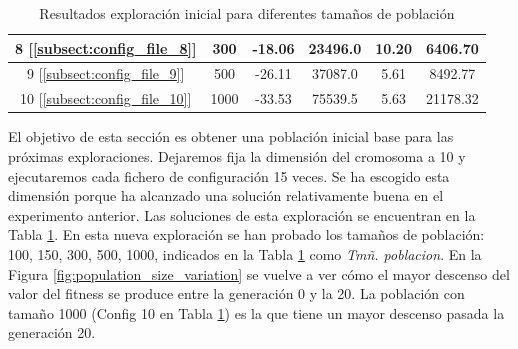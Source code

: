 \begin{table}[]
\begin{tabular}{|c|c|c|c|c|c|}
        8  [\ref{subsect:config_file_8}]                & 300                                                               & -18.06                                                                                & 23496.0                                                                            & 10.20                                                                         & 6406.70                                                                     \\ \hline
        9  [\ref{subsect:config_file_9}]                & 500                                                               & -26.11                                                                                & 37087.0                                                                            & 5.61                                                                          & 8492.77                                                                     \\ \hline
        10 [\ref{subsect:config_file_10}]               & 1000                                                              & -33.53                                                                                & 75539.5                                                                            & 5.63                                                                          & 21178.32                                                                    \\ \hline
    \end{tabular}
    \caption{Resultados exploración inicial para diferentes tamaños de población}
    \label{tab:base_population}
\end{table}

El objetivo de esta sección es obtener una población inicial base para las próximas exploraciones. Dejaremos fija la dimensión del cromosoma a 10 y
ejecutaremos cada fichero de configuración 15 veces. Se ha escogido esta dimensión porque ha alcanzado una solución 
relativamente buena en el experimento anterior. Las soluciones de esta exploración se encuentran en la Tabla \ref{tab:base_population}. 
En esta nueva exploración se han probado los tamaños de población: 100, 150, 300, 500, 1000, indicados en la Tabla \ref{tab:base_population}
como \textit{Tmñ. poblacion}. En la Figura \ref{fig:population_size_variation} se vuelve a ver cómo el mayor descenso del valor del fitness se produce
entre la generación 0 y la 20. La población con tamaño 1000 (Config 10 en Tabla \ref{tab:base_population}) es la que tiene
un mayor descenso pasada la generación 20. 

